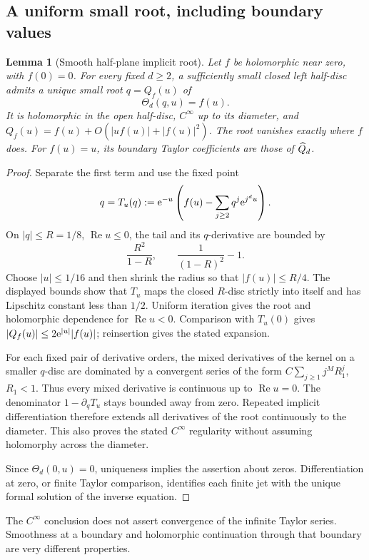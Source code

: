 \documentclass[11pt,a4paper]{article}
\numberwithin{equation}{section}
\newtheorem{lemma}[theorem]{Lemma}
\theoremstyle{definition}\newtheorem{definition}[theorem]{Definition}
\theoremstyle{remark}\newtheorem{remark}[theorem]{Remark}
\theoremstyle{definition}
\newcommand{\Rea}{\operatorname{Re}}\newcommand{\Ima}{\operatorname{Im}}
\begin{document}
\subsection{A uniform small root, including boundary values}
\begin{lemma}[Smooth half-plane implicit root]
\label{lem:root}
Let $f$ be holomorphic near zero, with $f(0)=0$. For every fixed $d\ge2$,
a sufficiently small closed left half-disc admits a unique small root
$q=Q_f(u)$ of
\begin{equation}
 \Theta_d(q,u)=f(u).
 \label{eq:forced}
\end{equation}
It is holomorphic in the open half-disc, $C^\infty$ up to its diameter, and
$Q_f(u)=f(u)+O(|u f(u)|+|f(u)|^2)$. The root vanishes exactly where $f$ does.
For $f(u)=u$, its boundary Taylor coefficients are those of $\widehat Q_d$.
\end{lemma}
\begin{proof}
Separate the first term and use the fixed point
\[
 q=T_u(q):=\mathrm e^{-u}\left(f(u)-\sum_{j\ge2}q^j\mathrm e^{j^d u}\right).
\]
On $|q|\le R=1/8$, $\Rea u\le0$, the tail and its $q$-derivative are bounded by
\[
 \frac{R^2}{1-R},\qquad \frac1{(1-R)^2}-1.
\]
Choose $|u|\le1/16$ and then shrink the radius so that $|f(u)|\le R/4$.
The displayed bounds show that $T_u$ maps the closed $R$-disc strictly into
itself and has Lipschitz constant less than $1/2$. Uniform iteration gives the
root and holomorphic dependence for $\Rea u<0$. Comparison with $T_u(0)$
gives $|Q_f(u)|\le2\mathrm e^{|u|}|f(u)|$; reinsertion gives the stated expansion.

For each fixed pair of derivative orders, the mixed derivatives of the kernel
on a smaller $q$-disc are dominated by a convergent series of the form
$C\sum_{j\ge1}j^M R_1^j$, $R_1<1$. Thus every mixed derivative is continuous
up to $\Rea u=0$. The denominator $1-\partial_qT_u$ stays bounded away from
zero. Repeated implicit differentiation therefore extends all derivatives of
the root continuously to the diameter. This also proves the stated
$C^\infty$ regularity without assuming holomorphy across the diameter.

Since $\Theta_d(0,u)=0$, uniqueness implies the assertion about zeros.
Differentiation at zero, or finite Taylor comparison, identifies each finite
jet with the unique formal solution of the inverse equation.
\end{proof}
The $C^\infty$ conclusion does not assert convergence of the infinite Taylor
series. Smoothness at a boundary and holomorphic continuation through that
boundary are very different properties.
\end{document}
